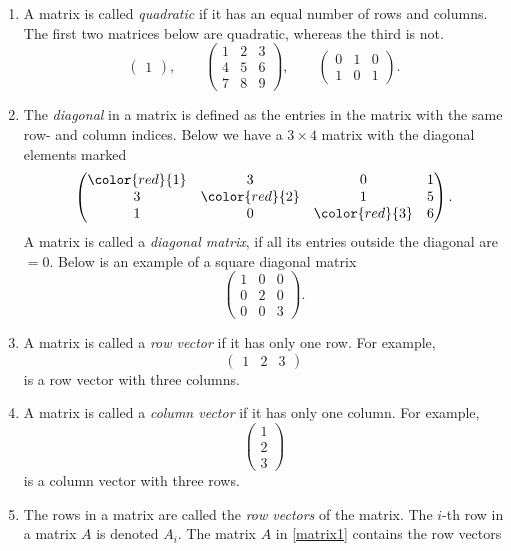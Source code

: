 \documentclass{article}
\begin{document}
\begin{enumerate}
\item
  A matrix is called  \emph{quadratic} if it has an equal number of rows and columns.
  The first two matrices below are quadratic, whereas the third is not.
$$
\begin{pmatrix} 1 \end{pmatrix}, \qquad
\begin{pmatrix} 1 & 2 & 3\\ 4 & 5 & 6\\ 7 & 8 & 9\end{pmatrix}, \qquad
\begin{pmatrix} 0 & 1 & 0\\ 1 & 0 & 1\end{pmatrix}.
$$
\item 
\label{diagonalmat}
The \emph{diagonal} in a matrix is defined as the entries in the matrix with the same row- and column indices.
Below we have a $3\times 4$ matrix with the diagonal elements marked
$$
\begin{pmatrix}
\color{red}{1} & 3 & 0 & 1\\
3 & \color{red}{2} & 1 & 5\\
1 & 0 & \color{red}{3} & 6
\end{pmatrix}.
$$
A matrix is called a \emph{diagonal matrix}, if all its entries outside the
diagonal are $=0$. Below is an example of a square diagonal matrix
$$
\begin{pmatrix}
1 & 0 & 0\\
0 & 2 & 0\\
0 & 0 & 3
\end{pmatrix}.
$$
\item
A matrix is called a \emph{row vector} if it has only one row. For example,
$$
\begin{pmatrix}
1 & 2 & 3
\end{pmatrix}
$$
is a row vector with three columns.
\item
A matrix is called a \emph{column vector} if it has only one column.
For example, 
$$
\begin{pmatrix}
1\\ 2 \\ 3
\end{pmatrix}
$$
is a column vector with three rows.
\item
  The rows in a matrix are called the  \emph{row vectors} of the matrix.
The $i$-th row in a matrix $A$ is denoted $A_i$.
The matrix $A$ in \eqref{matrix1} contains the row vectors

\end{enumerate}
\end{document}
